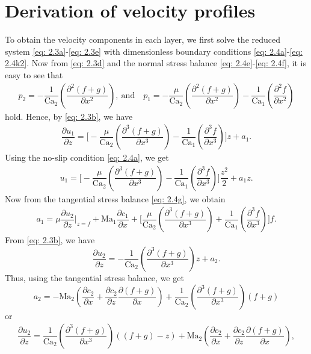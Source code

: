 \documentclass[11pt]{article}
\numberwithin{equation}{section}
\newtheorem{counter example}[theorem]{Counter Example}
\begin{document}
{\section{Derivation of velocity profiles}\label{sec: appendix}
To obtain the velocity components in each layer, we first solve the reduced system \eqref{eq: 2.3a}-\eqref{eq: 2.3e} with dimensionless boundary conditions \eqref{eq: 2.4a}-\eqref{eq: 2.4k2}. Now from \eqref{eq: 2.3d} and the normal stress balance \eqref{eq: 2.4e}-\eqref{eq: 2.4f}, it is easy to see that 
\begin{align*}
p_2=-\dfrac{1}{\mathrm{Ca_2}}\left(\dfrac{\partial^2 (f+g)}{\partial x^2}\right),~ \text{and}\quad p_1=-\dfrac{\mu}{\mathrm{Ca_2}}\left(\dfrac{\partial^2 (f+g)}{\partial x^2}\right)-\dfrac{1}{\mathrm{Ca_1}}\left(\dfrac{\partial^2 f}{\partial x^2}\right)
\end{align*}
hold. Hence, by \eqref{eq: 2.3b}, we have
\begin{align*}
    \dfrac{\partial u_1}{\partial z}=\bigg[-\dfrac{\mu}{\mathrm{Ca_2}}\left(\dfrac{\partial^3 (f+g)}{\partial x^3}\right)-\dfrac{1}{\mathrm{Ca_1}}\left(\dfrac{\partial^3 f}{\partial x^3}\right)\bigg]z+a_1. 
\end{align*}
Using the no-slip condition \eqref{eq: 2.4a}, we get
\begin{align}\label{eq: 2.22mainb}
   u_1=\bigg[-\dfrac{\mu}{\mathrm{Ca_2}}\left(\dfrac{\partial^3 (f+g)}{\partial x^3}\right)-\dfrac{1}{\mathrm{Ca_1}}\left(\dfrac{\partial^3 f}{\partial x^3}\right)\bigg]\dfrac{z^2}{2}+a_1z. 
\end{align}
Now from the tangential stress balance \eqref{eq: 2.4g}, we obtain
\begin{align*}
    a_1= \mu \dfrac{\partial u_2}{\partial z}\bigg|_{z=f}+\mathrm{Ma_1} \dfrac{\partial c_1}{\partial x}+\bigg[\dfrac{\mu}{\mathrm{Ca_2}}\left(\dfrac{\partial^3 (f+g)}{\partial x^3}\right)+\dfrac{1}{\mathrm{Ca_1}}\left(\dfrac{\partial^3 f}{\partial x^3}\right)\bigg]f.
    \end{align*}
From \eqref{eq: 2.3b}, we have $$\dfrac{\partial u_2}{\partial z}=-\dfrac{1}{\mathrm{Ca_2}}\left(\dfrac{\partial^3 (f+g)}{\partial x^3}\right)z+a_2.$$
Thus, using the tangential stress balance, we get
$$a_2= -\mathrm{Ma_2}\left(\dfrac{\partial c_2}{\partial x}+\dfrac{\partial c_2}{\partial z}\dfrac{\partial (f+g)}{\partial x}\right)+\dfrac{1}{\mathrm{\mathrm{Ca_2}}}\left(\dfrac{\partial^3 (f+g)}{\partial x^3}\right)(f+g)$$
or 
\begin{align}\label{eq: 2.20u_2}
\dfrac{\partial u_2}{\partial z}=\dfrac{1}{\mathrm{Ca_2}}\left(\dfrac{\partial^3 (f+g)}{\partial x^3}\right)((f+g)-z)+\mathrm{Ma_2}\left(\dfrac{\partial c_2}{\partial x}+\dfrac{\partial c_2}{\partial z}\dfrac{\partial (f+g)}{\partial x}\right),

\end{align}}
\end{document}
